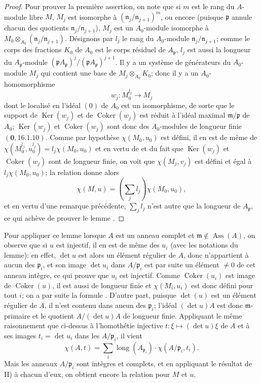 \begin{proof}
Pour prouver la première assertion, on note que si $m$ est le rang du $A$-module libre $M$, $M_j$ est isomorphe à $(\mathfrak{n}_j/\mathfrak{n}_{j+1})^m$, ou encore (puisque $\mathfrak{p}$ annule chacun des quotients $\mathfrak{n}_j/\mathfrak{n}_{j+1}$), $M_j$ est un $A_0$-module isomorphe à $M_0\otimes_{A_0}(\mathfrak{n}_j/\mathfrak{n}_{j+1})$.
Désignons par $l_j$ le rang du $A_0$-module $\mathfrak{n}_j/\mathfrak{n}_{j+1}$;
comme le corps des fractions $K_0$ de $A_0$ est le corps résiduel de $A_{\mathfrak{p}}$, $l_j$ est aussi la longueur du $A_{\mathfrak{p}}$-module $(\mathfrak{p}A_{\mathfrak{p}})^j/(\mathfrak{p}A_{\mathfrak{p}})^{j+1}$.
Il y a un système de générateurs du $A_0$-module $M_j$ qui contient une base de $M_j\otimes_{A_0}K_0$;
donc il y a un $A_0$-homomorphisme
\[
  w_j:M_0^{l_j}\to M_j
\]
dont le localisé en l'idéal $(0)$ de $A_0$ est un isomorphisme, de sorte que le support de $\operatorname{Ker}(w_j)$ et de $\operatorname{Coker}(w_j)$ est réduit à l'idéal maximal $\mathfrak{m}/\mathfrak{p}$ de $A_0$;
$\operatorname{Ker}(w_j)$ et $\operatorname{Coker}(w_j)$ sont donc des $A_0$-modules de longueur finie $(\mathbf{0},16.1.10)$.
Comme par hypothèse $\chi(M_0,u_0)$ est défini, il en est de même de $\chi(M_0^{l_j},u_0^{l_j})=l_j\chi(M_0,u_0)$ et en vertu de  et du fait que $\operatorname{Ker}(w_j)$ et $\operatorname{Coker}(w_j)$ sont de longueur finie, on voit que $\chi(M_j,v_j)$ est défini et égal à $l_j\chi(M_0,u_0)$;
la relation  donne alors
\[
  \chi(M,u)=\left(\sum_jl_j\right)\chi(M_0,u_0),
\]
et en vertu d'une remarque précédente, $\sum_jl_j$ n'est autre que la longueur de $A_{\mathfrak{p}}$, ce qui achève de prouver le lemme .
\end{proof}

Pour appliquer ce lemme lorsque $A$ est un anneau complet et $\mathfrak{m}\notin\operatorname{Ass}(A)$, on observe que si $u$ est injectif, il en est de même des $u_i$ (avec les notations du lemme):
en effet, $\det u$ est alors un élément régulier de $A$, donc n'appartient à aucun des $\mathfrak{p}_i$, et son image $\det u_i$ dans $A/\mathfrak{p}_i$ est par suite un élément $\neq0$ de cet anneau intègre, ce qui prouve que $u_i$ est injectif.
Comme $\operatorname{Coker}(u_i)$ est image de $\operatorname{Coker}(u)$, il est aussi de longueur finie et $\chi(M_i,u_i)$ est donc défini pour tout $i$;
on a par suite la formule .
D'autre part, puisque $\det(u)$ est un élément régulier de $A$, il n'est contenu dans aucun des $\mathfrak{p}_i$;
l'idéal $(\det u)A$ est donc $\mathfrak{m}$-primaire et le quotient $A/(\det u)A$ de longueur finie.
Appliquant le même raisonnement que ci-dessus à l'homothétie injective $t:\xi\mapsto(\det u)\xi$ de $A$ et à ses images $t_i=\det u_i$ dans les $A/\mathfrak{p}_i$, il vient
\[
  \chi(A,t)=\sum_i\operatorname{long}(A_{\mathfrak{p}_i})\cdot\chi(A/\mathfrak{p}_i,t_i).
\]
Mais les anneaux $A/\mathfrak{p}_i$ sont intègres et complets, et en appliquant le résultat de II) à chacun d'eux, on obtient encore la relation  pour $M$ et $u$.

